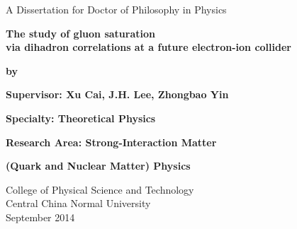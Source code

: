 \mbox{}\vskip 0.8cm
\begin{center}
{\Large A Dissertation for Doctor of Philosophy in Physics}
\end{center}
\vspace{0.22in}
\begin{center} {\LARGE \textbf{The study of gluon saturation \\ via dihadron correlations at a future electron-ion collider}}
\end{center}
\vspace{0.22in}

\begin{center}
\bfseries{
{\Large  by \\   \vskip 0.22in  \vskip 0.4in }
}
\end{center}


\mbox{}\hskip 0.3cm{\Large { \bfseries Supervisor:  Xu Cai, J.H. Lee, Zhongbao Yin
} }

\mbox{}\hskip 0.3cm{\Large { \bfseries Specialty:  Theoretical Physics} }

\mbox{}\hskip 0.3cm{\Large { \bfseries Research Area: Strong-Interaction Matter } }

\mbox{}\hskip 0.3cm{\Large { \bfseries (Quark and Nuclear Matter) Physics} }

\vskip 1.55in


\begin{center}
{\Large
College of Physical Science and Technology \\
Central \hskip 0.2cm China \hskip 0.2cm Normal \hskip 0.2cm University \\ 
\vskip 0.22cm September \hskip 0.2cm 2014 }
\end{center}

\clearpage
